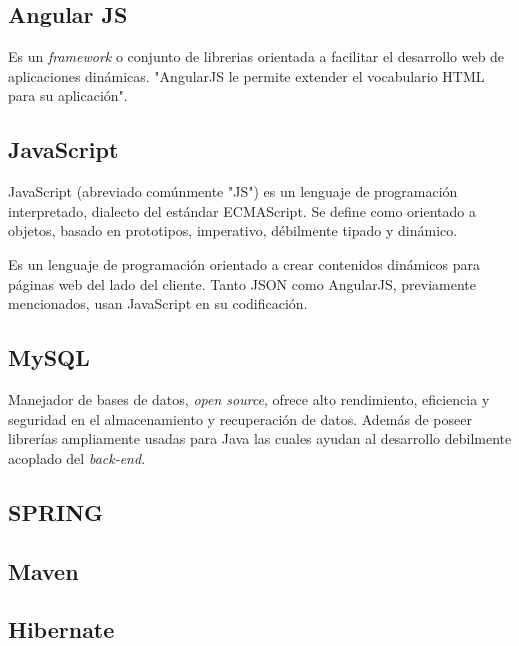         \subsection{Angular JS}
        
        Es un \textit{framework} o conjunto de librerias orientada a facilitar el desarrollo web de aplicaciones dinámicas. "AngularJS le permite extender el vocabulario HTML para su aplicación"\cite{ANGULARJS-angularjs}.
        
        \subsection{JavaScript}
        
        JavaScript (abreviado comúnmente "JS") es un lenguaje de programación interpretado, dialecto del estándar ECMAScript. Se define como orientado a objetos, basado en prototipos, imperativo, débilmente tipado y dinámico\cite{JAVASCRIPT-wiki}.
        
        Es un lenguaje de programación orientado a crear contenidos dinámicos para páginas web del lado del cliente. Tanto JSON como AngularJS, previamente mencionados, usan JavaScript en su codificación.
        
        \subsection{MySQL}
        
        Manejador de bases de datos, \textit{open source}, ofrece alto rendimiento, eficiencia y seguridad en el almacenamiento y recuperación de datos\cite{MYSQL-oracle}. Además de poseer librerías ampliamente usadas para Java las cuales ayudan al desarrollo debilmente acoplado del \textit{back-end}.
        
        \subsection{SPRING}
        
        \subsection{Maven}
        
        \subsection{Hibernate}
        
